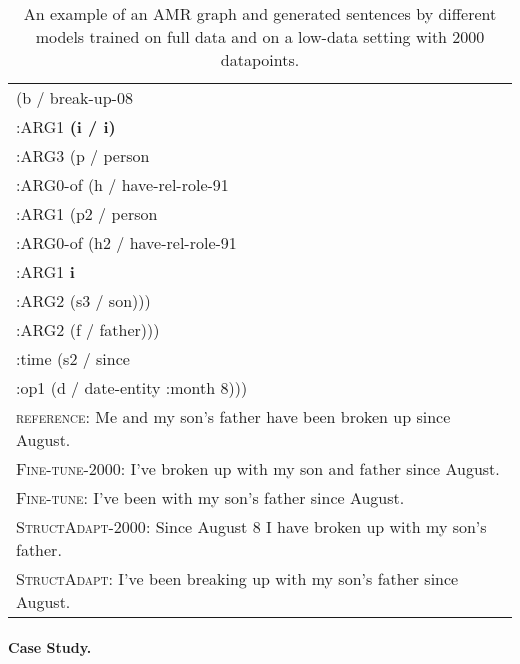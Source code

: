 \documentclass[11pt]{article}
\newcommand{\graphadapter}{{\small\textsc{StructAdapt}}\xspace}
\newcommand{\finetune}{{\small\textsc{Fine-tune}}\xspace}
\begin{document}
\begin{table}[!t]

	\small
	\centering
	\setlength{\tabcolsep}{3pt}
	\setlength\extrarowheight{-4pt}
	\begin{tabular}{p{7.5cm}}
		\toprule
		(b / break-up-08 \\
      \quad\quad :ARG1 {\color{red}\textbf{(i / i)}} \\
      \quad\quad :ARG3 (p / person \\
            \quad\quad\quad\quad :ARG0-of (h / have-rel-role-91 \\
                  \quad\quad\quad\quad\quad\quad :ARG1 (p2 / person \\
                        \quad\quad\quad\quad\quad\quad\quad\quad:ARG0-of (h2 / have-rel-role-91 \\
                              \quad\quad\quad\quad\quad\quad\quad\quad\quad\quad:ARG1 {\color{red}\textbf{i}} \\
                              \quad\quad\quad\quad\quad\quad\quad\quad\quad\quad :ARG2 (s3 / son))) \\
                  \quad\quad\quad\quad\quad\quad :ARG2 (f / father))) \\
      \quad\quad :time (s2 / since \\
            \quad\quad\quad\quad :op1 (d / date-entity :month 8))) \\
		\midrule
		{\small\textsc{reference}}: Me and my son's father have been broken up since August.\\
		\midrule
		\finetune{\small\textsc{-2000}}: I've broken up with my son and father since August.\\
		\midrule
		\finetune: I've been with my son's father since August.\\
		\midrule
		\graphadapter{\small\textsc{-2000}}: Since August 8 I have broken up with my son's father. \\
		\midrule
		\graphadapter: I've been breaking up with my son's father since August. \\
		\bottomrule
	\end{tabular}

	\caption{An example of an AMR graph and generated sentences by different models trained on full data and on a low-data setting with 2000 datapoints.}
	\label{tab:sampleamr}
\end{table}

\paragraph{Case Study.}
\end{document}
